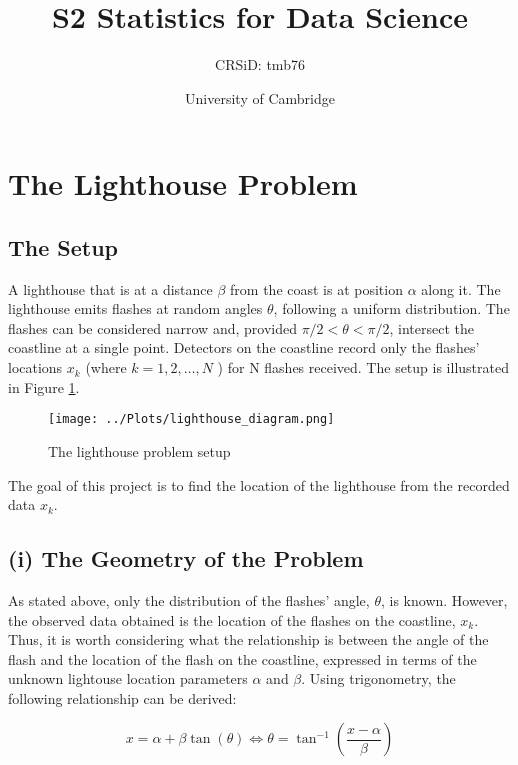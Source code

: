\documentclass[12pt]{report} %
\title{S2 Statistics for Data Science}
\author{CRSiD: tmb76}
\date{University of Cambridge}
\begin{document}
\maketitle

\tableofcontents

\chapter*{The Lighthouse Problem}

\section*{The Setup}

\indent A lighthouse that is at a distance $\beta$ from the coast is at position $\alpha$ along it. The lighthouse emits flashes at random angles $\theta$, following a uniform distribution. The flashes can be considered narrow and, provided $\pi/2 < \theta < \pi/2$, intersect the coastline at a single point. Detectors on the coastline record only the flashes' locations $x_{k}$ (where $k = 1, 2,\dots, N$ ) for N flashes received. The setup is illustrated in Figure \ref{fig:lighthouse}.

\begin{figure}[h]
\centering
\texttt{[image: ../Plots/lighthouse\_diagram.png]}
\caption{The lighthouse problem setup}
\label{fig:lighthouse}
\end{figure}


The goal of this project is to find the location of the lighthouse from the recorded data ${x_{k}}$.

\section*{(i) The Geometry of the Problem}

As stated above, only the distribution of the flashes' angle, $\theta$, is known. However, the observed data obtained is the location of the flashes on the coastline, $x_{k}$. Thus, it is worth considering what the relationship is between the angle of the flash and the location of the flash on the coastline, expressed in terms of the unknown lightouse location parameters $\alpha$ and $\beta$. Using trigonometry, the following relationship can be derived:

\begin{equation}
    x = \alpha + \beta \tan(\theta) \iff \theta = \tan^{-1}\left(\frac{x - \alpha}{\beta}\right)
\end{equation}
\end{document}

